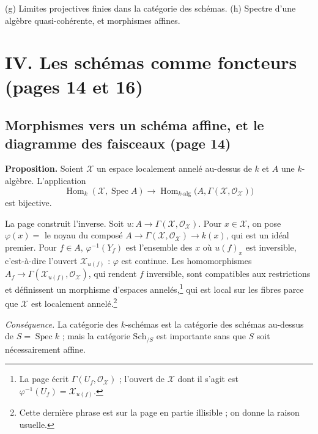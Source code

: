 \documentclass[11pt,a4paper]{article}
\begin{document}
(g) Limites projectives finies dans la catégorie des schémas. (h) Spectre d'une
algèbre quasi-cohérente, et morphismes affines.

\section*{IV. Les schémas comme foncteurs (pages 14 et 16)}

\subsection*{Morphismes vers un schéma affine, et le diagramme des faisceaux (page 14)}

\textbf{Proposition.} Soient $\mathcal{X}$ un espace localement annelé au-dessus
de $k$ et $A$ une $k$-algèbre. L'application
\[
\operatorname{Hom}_k(\mathcal{X}, \operatorname{Spec} A) \longrightarrow
\operatorname{Hom}_{k\text{-alg}}\bigl(A, \Gamma(\mathcal{X}, \mathcal{O}_{\mathcal{X}})\bigr)
\]
est bijective.

La page construit l'inverse. Soit $u : A \to \Gamma(\mathcal{X}, \mathcal{O}_{\mathcal{X}})$.
Pour $x \in \mathcal{X}$, on pose $\varphi(x) = $ le noyau du composé
$A \to \Gamma(\mathcal{X}, \mathcal{O}_{\mathcal{X}}) \to k(x)$, qui est un idéal
premier. Pour $f \in A$, $\varphi^{-1}(Y_f)$ est l'ensemble des $x$ où $u(f)_x$
est inversible, c'est-à-dire l'ouvert $\mathcal{X}_{u(f)}$ : $\varphi$ est
continue. Les homomorphismes
$A_f \to \Gamma(\mathcal{X}_{u(f)}, \mathcal{O}_{\mathcal{X}})$, qui rendent $f$
inversible, sont compatibles aux restrictions et définissent un morphisme
d'espaces annelés,\footnote{La page écrit
$\Gamma(U_f, \mathcal{O}_{\mathcal{X}})$ ; l'ouvert de $\mathcal{X}$ dont il
s'agit est $\varphi^{-1}(U_f) = \mathcal{X}_{u(f)}$.} qui est local sur les
fibres parce que $\mathcal{X}$ est localement annelé.\footnote{Cette dernière
phrase est sur la page en partie illisible ; on donne la raison usuelle.}

\emph{Conséquence.} La catégorie des $k$-schémas est la catégorie des
schémas au-dessus de $S = \operatorname{Spec} k$ ; mais la catégorie
$\mathrm{Sch}_{/S}$ est importante sans que $S$ soit nécessairement affine.
\end{document}
